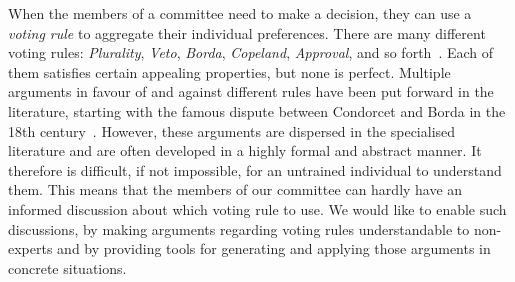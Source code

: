 \documentclass{comsoc2016}
\begin{document}
When the members of a committee need to make a decision, they can use a \emph{voting rule} to aggregate their individual preferences. %
%
There are many different voting rules: \emph{Plurality}, \emph{Veto}, \emph{Borda}, \emph{Copeland}, \emph{Approval}, and so forth~\citep{Taylor2005}. Each of them satisfies certain appealing properties, but none is perfect. 
Multiple arguments in favour of and against 
different rules have been put forward in the literature, starting with the famous dispute between Condorcet and Borda in the 18th century~\citep{McLeanUrken1995}. However, these arguments are dispersed in the specialised literature
and are often developed in a highly formal and abstract manner. It therefore is difficult, if not impossible, for an untrained individual to understand them. This means that the members of our committee can hardly have an informed discussion about which voting rule to use.
We would like to enable such discussions, by making arguments regarding voting rules understandable to non-experts and by providing tools for generating and applying those arguments in concrete situations. 
\end{document}
